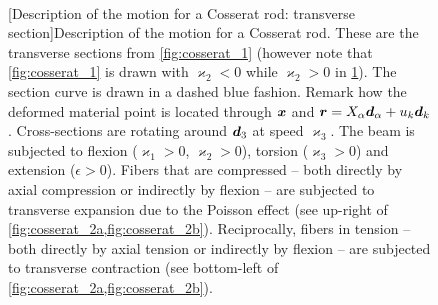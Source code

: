 \begin{figure}[p]
	\begin{fullpage}
		\captionsetup[subfloat]{captionskip=10pt}
     		\centering
		\hspace{2.5cm}
		 \\
		\vspace{20pt}
		\hspace{2.5cm}
		\vspace{20pt}
		[Description of the motion for a Cosserat rod: transverse section]{Description of the motion for a Cosserat rod. These are the transverse sections from \cref{fig:cosserat_1} (however note that \cref{fig:cosserat_1} is drawn with $\varkappa_2 < 0$ while $\varkappa_2 > 0$ in \cref{fig:cosserat_2}). The section curve is drawn in a dashed blue fashion. Remark how the deformed material point is located through $\boldsymbol{x}$ and $\boldsymbol{r} = X_{\alpha}\boldsymbol{d}_{\alpha} + u_{k}\boldsymbol{d}_{k}$. Cross-sections are rotating around $\boldsymbol{d}_3$ at speed $\varkappa_3$. The beam is subjected to flexion ($\varkappa_1 > 0$, $\varkappa_2 > 0$), torsion ($\varkappa_3 > 0$) and extension ($\epsilon > 0$). Fibers that are compressed -- both directly by axial compression or indirectly by flexion -- are subjected to transverse expansion due to the Poisson effect (see up-right of \cref{fig:cosserat_2a,fig:cosserat_2b}). Reciprocally, fibers in tension -- both directly by axial tension or indirectly by flexion -- are subjected to transverse contraction (see bottom-left of \cref{fig:cosserat_2a,fig:cosserat_2b}).}
		\label{fig:cosserat_2}    
	\end{fullpage}
\end{figure}

